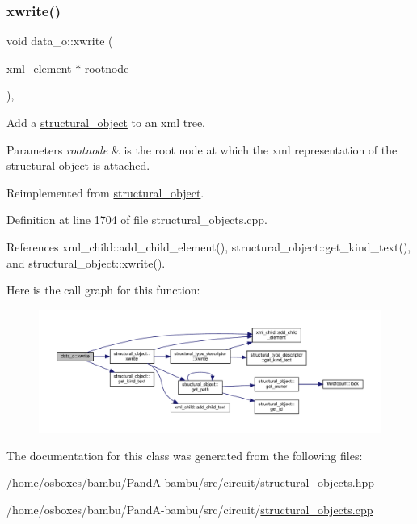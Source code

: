 \subsubsection{\texorpdfstring{xwrite()}{xwrite()}}
{\footnotesize\ttfamily void data\+\_\+o\+::xwrite (\begin{DoxyParamCaption}\item[{\hyperlink{classxml__element}{xml\+\_\+element} $\ast$}]{rootnode }\end{DoxyParamCaption})\hspace{0.3cm}{\ttfamily [override]}, {\ttfamily [virtual]}}



Add a \hyperlink{classstructural__object}{structural\+\_\+object} to an xml tree. 


\begin{DoxyParams}{Parameters}
{\em rootnode} & is the root node at which the xml representation of the structural object is attached. \\
\hline
\end{DoxyParams}


Reimplemented from \hyperlink{classstructural__object_a7b0b509094451578b2dc10a9b716b16e}{structural\+\_\+object}.



Definition at line 1704 of file structural\+\_\+objects.\+cpp.



References xml\+\_\+child\+::add\+\_\+child\+\_\+element(), structural\+\_\+object\+::get\+\_\+kind\+\_\+text(), and structural\+\_\+object\+::xwrite().

Here is the call graph for this function\+:
\nopagebreak
\begin{figure}[H]
\begin{center}
\leavevmode
\includegraphics[width=350pt]{d5/d34/classdata__o_a80c100b49475f7279913eed46a728366_cgraph}
\end{center}
\end{figure}


The documentation for this class was generated from the following files\+:\begin{DoxyCompactItemize}
\item 
/home/osboxes/bambu/\+Pand\+A-\/bambu/src/circuit/\hyperlink{structural__objects_8hpp}{structural\+\_\+objects.\+hpp}\item 
/home/osboxes/bambu/\+Pand\+A-\/bambu/src/circuit/\hyperlink{structural__objects_8cpp}{structural\+\_\+objects.\+cpp}\end{DoxyCompactItemize}
